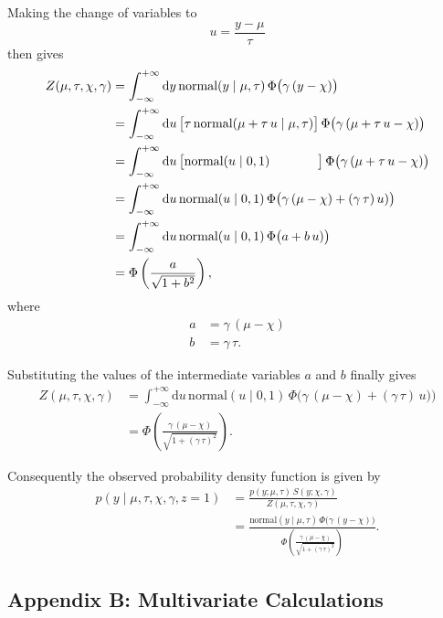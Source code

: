 \documentclass[
  letterpaper,
  DIV=11,
  numbers=noendperiod]{scrartcl}
\begin{document}
Making the change of variables to \[
u = \frac{y - \mu}{ \tau }
\] then gives \begin{align*}
Z(\mu, \tau, \chi, \gamma)
&=
\int_{-\infty}^{+\infty} \mathrm{d} y \,
\text{normal}(y \mid \mu, \tau) \, \Phi \big( \gamma \, (y - \chi) \big)
\\
&=
\int_{-\infty}^{+\infty} \mathrm{d} u \,
\big[ \tau \, \text{normal}(\mu + \tau \, u \mid \mu, \tau) \big] \,
\Phi \big( \gamma \, (\mu + \tau \, u - \chi) \big)
\\
&=
\int_{-\infty}^{+\infty} \mathrm{d} u \,
\big[ \text{normal}(u \mid 0, 1) \hspace{13.2mm} \big] \,
\Phi \big( \gamma \, (\mu + \tau \, u - \chi) \big)
\\
&=
\int_{-\infty}^{+\infty} \mathrm{d} u \,
\text{normal}(u \mid 0, 1) \,
\Phi \big( \gamma \, (\mu - \chi) + (\gamma \, \tau) \, u) \big)
\\
&=
\int_{-\infty}^{+\infty} \mathrm{d} u \,
\text{normal}(u \mid 0, 1) \, \Phi \big( a + b \, u) \big)
\\
&=
\Phi \left( \frac{ a }{ \sqrt{1 + b^{2} } } \right),
\end{align*} where \begin{align*}
a &= \gamma \, (\mu - \chi)
\\
b &= \gamma \, \tau.
\end{align*}

Substituting the values of the intermediate variables \(a\) and \(b\)
finally gives \begin{align*}
Z(\mu, \tau, \chi, \gamma)
&=
\int_{-\infty}^{+\infty} \mathrm{d} u \,
\text{normal}(u \mid 0, 1) \,
\Phi \big( \gamma \, (\mu - \chi) + (\gamma \, \tau) \, u) \big)
\\
&=
\Phi \left( \frac{ \gamma \, (\mu - \chi) }
                 { \sqrt{1 + (\gamma \, \tau)^{2} } } \right).
\end{align*}

Consequently the observed probability density function is given by
\begin{align*}
p(y \mid \mu, \tau, \chi, \gamma, z = 1)
&=
\frac{ p(y; \mu, \tau) \, S(y; \chi, \gamma) }{ Z(\mu, \tau, \chi, \gamma) }
\\
&=
\frac{  \text{normal}(y \mid \mu, \tau) \,
        \Phi \big( \gamma \, (y - \chi) \big) }
{ \Phi \left( \frac{ \gamma \, (\mu - \chi) }
                   { \sqrt{1 + (\gamma \, \tau)^{2} } } \right) }.
\end{align*}

\subsection*{Appendix B: Multivariate
Calculations}\label{sec:appendix_multi}
\end{document}
